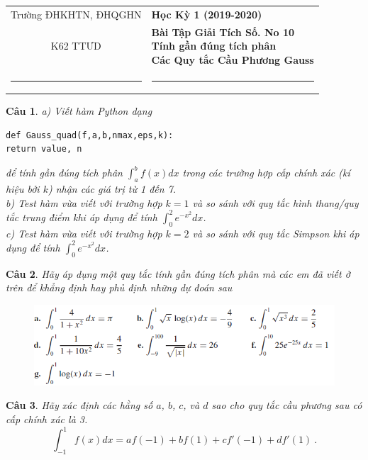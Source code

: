 \documentclass[11pt]{article}
\newtheorem{bt}{Câu}
\begin{document}
\begin{tabular*}
{\linewidth}{c>{\centering\hspace{0pt}} p{}}
Trường ĐHKHTN, ĐHQGHN & {\bf Học Kỳ 1 (2019-2020)}
\tabularnewline
K62 TTƯD & {\bf Bài Tập Giải Tích Số. No 10 \\ Tính gần đúng tích phân \\ Các Quy tắc Cầu Phương Gauss}
\tabularnewline
\rule{1in}{1pt}  \small  & \rule{2in}{1pt} %
\tabularnewline


\end{tabular*}
%

\begin{bt}
a) Viết hàm Python dạng 
%
\begin{lstlisting}[frame=single] 
def Gauss_quad(f,a,b,nmax,eps,k):
return value, n
\end{lstlisting}
%	 
để tính gần đúng tích phân $\int_{a}^{b} f(x)dx$ trong các trường hợp cấp chính xác (kí hiệu bởi $k$) nhận các giá trị từ 1 đến 7. \\
b) Test hàm vừa viết với trường hợp $k=1$ và so sánh với quy tắc hình thang/quy tắc trung điểm khi áp dụng để tính $\int_{0}^{2} e^{-x^2}dx$.\\
c) Test hàm vừa viết với trường hợp $k=2$ và so sánh với quy tắc Simpson khi áp dụng để tính $\int_{0}^{2} e^{-x^2}dx$.
\end{bt}

\begin{bt}
Hãy áp dụng một quy tắc tính gần đúng tích phân mà các em đã viết ở trên để khẳng định hay phủ định những dự đoán sau
\begin{figure}[h!]
	\centering
	\includegraphics[width=0.9\linewidth]{1}
	\label{fig:1}
\end{figure}
\end{bt}

\begin{bt} %
Hãy xác định các hằng số $a$, $b$, $c$, và $d$ sao cho quy tắc cầu phương sau có cấp chính xác là 3.
%
\[ \int_{-1}^{1} f(x) dx = a f(-1) + bf (1) + cf'(-1) + df'(1) \ .
 \]
%
\end{bt}
\end{document}
